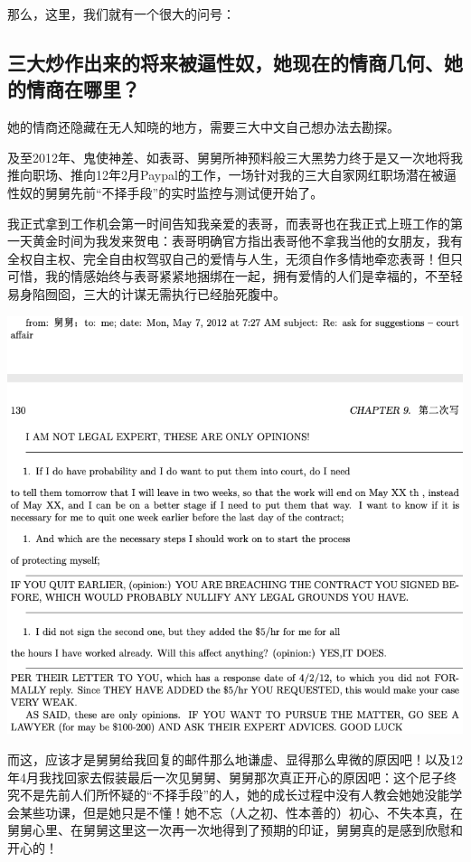 \documentclass[9pt, b5paper]{article}
\begin{document}
那么，这里，我们就有一个很大的问号：

\subsection{三大炒作出来的将来被逼性奴，她现在的情商几何、她的情商在哪里？}
\label{sec:org29d1f5d}

她的情商还隐藏在无人知晓的地方，需要三大中文自己想办法去勘探。

及至2012年、鬼使神差、如表哥、舅舅所神预料般三大黑势力终于是又一次地将我推向职场、推向12年2月Paypal的工作，一场针对我的三大自家网红职场潜在被逼性奴的舅舅先前“不择手段”的实时监控与测试便开始了。

我正式拿到工作机会第一时间告知我亲爱的表哥，而表哥也在我正式上班工作的第一天黄金时间为我发来贺电：表哥明确官方指出表哥他不拿我当他的女朋友，我有全权自主权、完全自由权驾驭自己的爱情与人生，无须自作多情地牵恋表哥！但只可惜，我的情感始终与表哥紧紧地捆绑在一起，拥有爱情的人们是幸福的，不至轻易身陷囫囵，三大的计谋无需执行已经胎死腹中。

\begin{center}
\includegraphics[width=.9\linewidth]{./pic/readme_20210412_175551.png}
\end{center}

而这，应该才是舅舅给我回复的邮件那么地谦虚、显得那么卑微的原因吧！以及12年4月我找回家去假装最后一次见舅舅、舅舅那次真正开心的原因吧：这个尼子终究不是先前人们所怀疑的“不择手段”的人，她的成长过程中没有人教会她她没能学会某些功课，但是她只是不懂！她不忘（人之初、性本善的）初心、不失本真，在舅舅心里、在舅舅这里这一次再一次地得到了预期的印证，舅舅真的是感到欣慰和开心的！
\end{document}
